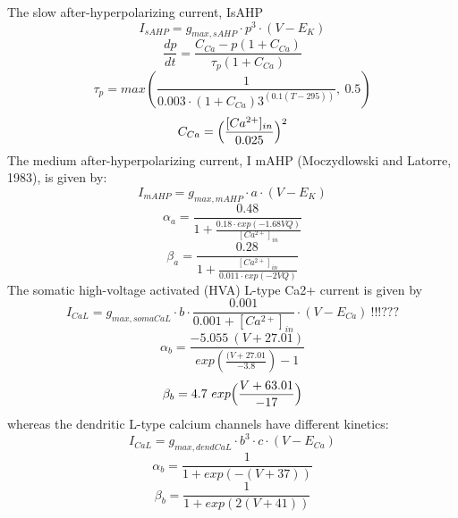 \documentclass[12pt]{article}
\begin{document}
The slow after-hyperpolarizing current, IsAHP
\begin{equation}
I_{sAHP} = g_{max, sAHP} \cdot p^3 \cdot (V - E_{K})
\end{equation}
\begin{equation}
\frac{dp}{dt} = \frac{C_{Ca} - p(1 + C_{Ca})}{\tau_p(1 + C_{Ca})}
\end{equation}
\begin{equation}
\tau_{p} = max( \frac{1}{0.003 \cdot (1 + C_{Ca}) 3^(0.1(T-295))}, \ 0.5)
\end{equation}
\begin{equation}
C_{Ca} = \Bigl(\frac{[Ca^{2+}]_{in}}{0.025} \Bigl)^2
\end{equation}
\newline
The medium after-hyperpolarizing current, I mAHP (Moczydlowski and Latorre, 1983), is given by:
\begin{equation}
I_{mAHP} = g_{max, mAHP} \cdot a \cdot (V - E_{K})
\end{equation}
\begin{equation}
\alpha_{a} = \frac{0.48}{1 + \frac{0.18 \cdot exp(-1.68 V Q)}{[Ca^{2+}]_{in}}}
\end{equation}
\begin{equation}
\beta_{a} = \frac{0.28}{1 + \frac{[Ca^{2+}]_{in}}{0.011 \cdot exp(-2 V Q)}}
\end{equation}
\newline
The somatic high-voltage activated (HVA) L-type Ca2+ current is given by
\begin{equation}
I_{CaL} = g_{max, soma CaL} \cdot b \cdot \frac{0.001}{0.001 + [Ca^{2+}]_{in}} \cdot (V - E_{Ca}) \ !!!???
\end{equation}
\begin{equation}
\alpha_{b} = \frac{-5.055 \ (V + 27.01)}{exp( \frac{(V + 27.01}{-3.8})  - 1}
\end{equation}
\begin{equation}
\beta_{b} = 4.7 \ exp \Bigl( \frac{V + 63.01}{-17} \Bigl)
\end{equation}
whereas the dendritic L-type calcium channels have different kinetics:
\begin{equation}
I_{CaL} = g_{max, dend CaL} \cdot b^3 \cdot c \cdot (V - E_{Ca})
\end{equation}
\begin{equation}
\alpha_{b} = \frac{1}{1 + exp(-(V + 37)) }
\end{equation}
\begin{equation}
\beta_{b} = \frac{1}{1 + exp(2(V + 41)) }
\end{equation}
\end{document}
